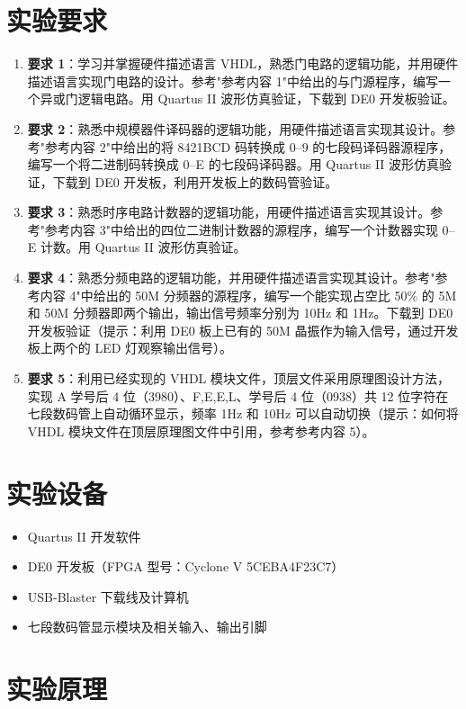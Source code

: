 \documentclass[12pt]{ctexart}
\begin{document}
\section{实验要求}

\begin{enumerate}
    \item \textbf{要求 1}：学习并掌握硬件描述语言 VHDL，熟悉门电路的逻辑功能，并用硬件描述语言实现门电路的设计。参考"参考内容 1"中给出的与门源程序，编写一个异或门逻辑电路。用 Quartus II 波形仿真验证，下载到 DE0 开发板验证。
    \item \textbf{要求 2}：熟悉中规模器件译码器的逻辑功能，用硬件描述语言实现其设计。参考"参考内容 2"中给出的将 8421BCD 码转换成 0--9 的七段码译码器源程序，编写一个将二进制码转换成 0--E 的七段码译码器。用 Quartus II 波形仿真验证，下载到 DE0 开发板，利用开发板上的数码管验证。
    \item \textbf{要求 3}：熟悉时序电路计数器的逻辑功能，用硬件描述语言实现其设计。参考"参考内容 3"中给出的四位二进制计数器的源程序，编写一个计数器实现 0--E 计数。用 Quartus II 波形仿真验证。
    \item \textbf{要求 4}：熟悉分频电路的逻辑功能，并用硬件描述语言实现其设计。参考"参考内容 4"中给出的 50M 分频器的源程序，编写一个能实现占空比 50\% 的 5M 和 50M 分频器即两个输出，输出信号频率分别为 10Hz 和 1Hz。下载到 DE0 开发板验证（提示：利用 DE0 板上已有的 50M 晶振作为输入信号，通过开发板上两个的 LED 灯观察输出信号）。
    \item \textbf{要求 5}：利用已经实现的 VHDL 模块文件，顶层文件采用原理图设计方法，实现 A 学号后 4 位（3980）、F,E,E,L、学号后 4 位（0938）共 12 位字符在七段数码管上自动循环显示，频率 1Hz 和 10Hz 可以自动切换（提示：如何将 VHDL 模块文件在顶层原理图文件中引用，参考参考内容 5）。
\end{enumerate}

\section{实验设备}

\begin{itemize}
    \item Quartus II 开发软件
    \item DE0 开发板（FPGA 型号：Cyclone V 5CEBA4F23C7）
    \item USB-Blaster 下载线及计算机
    \item 七段数码管显示模块及相关输入、输出引脚
\end{itemize}

\section{实验原理}
\end{document}
